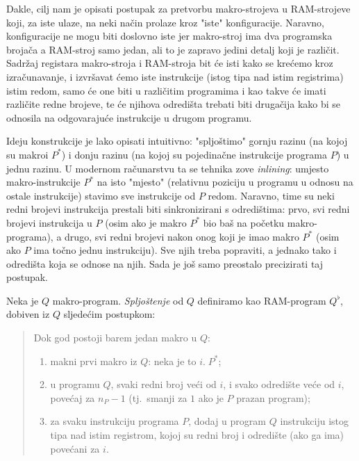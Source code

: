 Dakle, cilj nam je opisati postupak za pretvorbu makro-strojeva u RAM-strojeve koji, za iste ulaze, na neki način prolaze kroz "iste" konfiguracije. Naravno, konfiguracije ne mogu biti doslovno iste jer makro-stroj ima dva programska brojača a RAM-stroj samo jedan, ali to je zapravo jedini detalj koji je različit. Sadržaj registara makro-stroja i RAM-stroja bit će isti kako se krećemo kroz izračunavanje, i izvršavat ćemo iste instrukcije (istog tipa nad istim registrima) istim redom, samo će one biti u različitim programima i kao takve će imati različite redne brojeve, te će njihova odredišta trebati biti drugačija kako bi se odnosila na odgovarajuće instrukcije u drugom programu.

Ideju konstrukcije je lako opisati intuitivno: "spljoštimo" gornju razinu (na kojoj su makroi $P^*$) i donju razinu (na kojoj su pojedinačne instrukcije programa $P$) u jednu razinu. U modernom računarstvu ta se tehnika zove \emph{inlining}: umjesto makro-instrukcije $P^*$ na isto "mjesto" (relativnu poziciju u programu u odnosu na ostale instrukcije) stavimo sve instrukcije od $P$ redom. Naravno, time su neki redni brojevi instrukcija prestali biti sinkronizirani s odredištima: prvo, svi redni brojevi instrukcija u $P$ (osim ako je makro $P^*$ bio baš na početku makro-programa), a drugo, svi redni brojevi nakon onog koji je imao makro $P^*$ (osim ako $P$ ima točno jednu instrukciju). Sve njih treba popraviti, a jednako tako i odredišta koja se odnose na njih. Sada je još samo preostalo precizirati taj postupak.

\begin{definicija}\label{def:flat}
Neka je $Q$ makro-program. \emph{Spljoštenje} od $Q$ definiramo kao RAM-program $Q^\flat$, dobiven iz $Q$ sljedećim postupkom:
\begin{quotation}
Dok god postoji barem jedan makro u $Q$:
\begin{enumerate}
    \item\label{korak:makni} makni prvi makro iz $Q$: neka je to $i.\;P^*$;
    \item\label{korak:renumeriraj} u programu $Q$, svaki redni broj veći od $i$, i svako odredište veće od $i$, povećaj za $n_P-1$ (tj.\ smanji za $1$ ako je $P$ prazan program);
    \item\label{korak:dodaj} za svaku instrukciju programa $P$, dodaj u program $Q$ instrukciju istog tipa nad istim registrom, kojoj su redni broj i odredište (ako ga ima) povećani za $i$.\qedhere
\end{enumerate}
\end{quotation}
\end{definicija}

